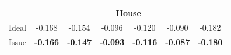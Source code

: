 \documentclass{beamer}
\begin{document}
{\begin{tabular}{|c|cccccc|}
    \hline
    \hline
    & \multicolumn{6}{|c|}{\textbf{House}} \\
    \hline
    Ideal & \hspace{-4pt} -0.168 \hspace{-5pt}
    & \hspace{-4pt} -0.154 \hspace{-5pt}
    & \hspace{-4pt} -0.096 \hspace{-5pt}
    & \hspace{-4pt} -0.120 \hspace{-5pt}
    & \hspace{-4pt} -0.090 \hspace{-5pt}
    & \hspace{-4pt} -0.182 \hspace{-4pt} \\
    Issue
    & \hspace{-4pt} \textbf{-0.166} \hspace{-5pt}
    & \hspace{-4pt} \textbf{-0.147} \hspace{-5pt}
    & \hspace{-4pt} \textbf{-0.093} \hspace{-5pt}
    & \hspace{-4pt} \textbf{-0.116} \hspace{-5pt}
    & \hspace{-4pt} \textbf{-0.087} \hspace{-5pt}
    & \hspace{-4pt} \textbf{-0.180} \hspace{-4pt} \\
    \hline
  \end{tabular}
}
\end{document}
